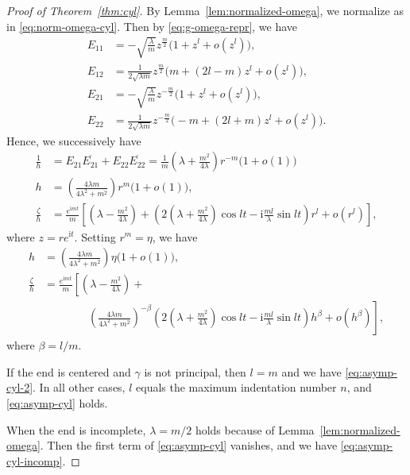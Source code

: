 \documentclass[a4paper]{amsart}
\theoremstyle{plain}
\theoremstyle{remark}
\numberwithin{equation}{section}
\begin{document}
\begin{proof}[Proof of Theorem~\ref{thm:cyl}]
 By Lemma~\ref{lem:normalized-omega},
 we normalize as in \eqref{eq:norm-omega-cyl}.
 Then by \eqref{eq:g-omega-repr}, we have
 \begin{align*}
  E_{11}&=  -\sqrt{\frac{\lambda}{m}}z^{\frac{m}{2}}
          \bigl(1+z^l+o(z^l)\bigr),\\
  E_{12}&=  \frac{1}{2\sqrt{\lambda m}}z^{\frac{m}{2}}
             \bigl(m+(2l-m)z^l+o(z^l)\bigr),\\
  E_{21}&=  -\sqrt{\frac{\lambda}{m}}z^{-\frac{m}{2}}
          \bigl(1+z^l+o(z^l)\bigr),\\
  E_{22}&=  \frac{1}{2\sqrt{\lambda m}}z^{-\frac{m}{2}}
             \bigl(-m+(2l+m)z^l+o(z^l)\bigr).
 \end{align*}
 Hence, we successively have
 \begin{align*}
   \frac{1}{h}&=
     E_{21}\overline{E_{21}} + E_{22}\overline{E_{22}} 
      = \frac{1}{m}\left(\lambda+\frac{m^2}{4\lambda}\right)
        r^{-m}
        \bigl(1+o(1)\bigr)\\
    h&=\left(\frac{4\lambda m}{4\lambda^2+m^2}\right)r^m \bigl(1+o(1)\bigr),\\
    \frac{\zeta}{h} &=
       \frac{e^{{\mathrm{i}} m t}}{m}
       \left[
          \left(\lambda-\frac{m^2}{4\lambda}\right)+
           \left(
           2\left(\lambda+\frac{m^2}{4\lambda}\right)\cos l t -
             {\mathrm{i}}\frac{ml}{\lambda}\sin l t
	   \right)r^l + o(r^l)
       \right],
 \end{align*}
 where $z=re^{{\mathrm{i}} t}$.
 Setting $r^m=\eta$, we have
 \begin{align*}
   h &= \left(
          \frac{4\lambda m}{4\lambda^2+m^2}
        \right)\eta\bigl(1+o(1)\bigr),\\
   \frac{\zeta}{h} &=
       \frac{e^{{\mathrm{i}} m t}}{m}\left[
          \left(\lambda-\frac{m^2}{4\lambda}\right)+\right.\\
        &\hspace{4em}
         \left.
          \left(
              \frac{4\lambda m}{4\lambda^2+m^2}
          \right)^{-\beta}
          \left(
           2\left(\lambda+\frac{m^2}{4\lambda}\right)\cos l t -
             {\mathrm{i}}\frac{ml}{\lambda}\sin l t
	   \right)
           h^{\beta} + o(h^{\beta})
       \right],
 \end{align*}
 where $\beta=l/m$.

 If the end is centered and $\gamma$ is not principal,
 then $l=m$ and we have \eqref {eq:asymp-cyl-2}.
 In all other cases, $l$ equals the maximum indentation number $n$, 
 and \eqref{eq:asymp-cyl} holds.

 When the end is incomplete, $\lambda=m/2$ holds because of 
 Lemma~\ref{lem:normalized-omega}.
 Then the first term of \eqref{eq:asymp-cyl} 
 vanishes, 
 and we have \eqref{eq:asymp-cyl-incomp}.
\end{proof}
\end{document}
